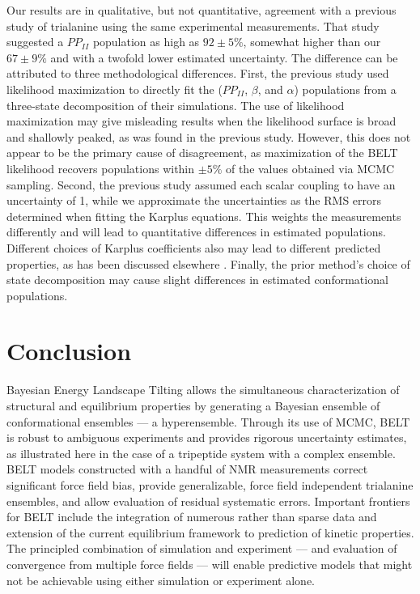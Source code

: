 \documentclass[journal=jacsat,manuscript=article]{achemso}
\begin{document}
Our results are in qualitative, but not quantitative, agreement with a previous study of trialanine \cite{Graf2007} using the same experimental measurements.  That study suggested a $PP_{II}$ population as high as $92 \pm 5\%$, somewhat higher than our $67 \pm 9 \%$ and with a twofold lower estimated uncertainty.  The difference can be attributed to three methodological differences.  First, the previous study used likelihood maximization to directly fit the ($PP_{II}$, $\beta$, and $\alpha$) populations from a three-state decomposition of their simulations.  The use of likelihood maximization may give misleading results when the likelihood surface is broad and shallowly peaked, as was found in the previous study.  However, this does not appear to be the primary cause of disagreement, as maximization of the BELT likelihood recovers populations within $\pm 5\%$ of the values obtained via MCMC sampling.  Second, the previous study assumed each scalar coupling to have an uncertainty of 1, while we approximate 
the uncertainties as the RMS errors 
determined when fitting the Karplus equations.  This weights the measurements differently and will lead to quantitative differences in estimated populations.  Different choices of Karplus coefficients also may lead to different predicted properties, as has been discussed elsewhere \cite{markwick2009structural}.    Finally, the prior method's choice of state decomposition may cause slight differences in estimated conformational populations.  



\section*{Conclusion}

Bayesian Energy Landscape Tilting allows the simultaneous characterization of structural and equilibrium properties by generating a Bayesian ensemble of conformational ensembles --- a hyperensemble.  Through its use of MCMC, BELT is robust to ambiguous experiments and provides rigorous uncertainty estimates, as illustrated here in the case of a tripeptide system with a complex ensemble.  BELT models constructed with a handful of NMR measurements correct significant force field bias, provide generalizable, force field independent trialanine ensembles, and allow evaluation of residual systematic errors. Important frontiers for BELT include the integration of numerous rather than sparse data and extension of the current equilibrium framework to prediction of kinetic properties.  The principled combination of simulation and experiment --- and evaluation of convergence from multiple force fields ---  will enable predictive models that might not be achievable using either simulation or experiment alone.  
\end{document}

